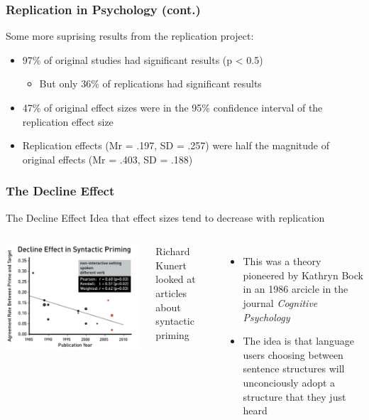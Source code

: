 \documentclass[10pt, block=fill]{beamer}
\begin{document}
\begin{frame}
  \frametitle{Replication in Psychology (cont.)}

  Some more suprising results from the replication project:
  \begin{itemize}
    \item 97\% of original studies had significant results (p < 0.5)
    \begin{itemize}
        \item But only 36\% of replications had significant results
    \end{itemize}
    \item 47\% of original effect sizes were in the 95\% confidence interval of the replication effect size
    \item Replication effects (Mr = .197, SD = .257) were half the magnitude of original effects (Mr = .403, SD = .188)
  \end{itemize}
\end{frame}


\begin{frame}
  \frametitle{The Decline Effect}
  
  \begin{block}{The Decline Effect}
      Idea that effect sizes tend to decrease with replication
  \end{block}
  
  \begin{columns}
    \includegraphics[width=0.95\linewidth]{figures/decline_effect.png}
   
    Richard Kunert looked at articles about syntactic priming
    \begin{itemize}
      \item This was a theory pioneered by Kathryn Bock in an 1986 arcicle in the journal \textit{Cognitive Psychology}
      \item The idea is that language users choosing between sentence structures will unconciously adopt a structure that they just heard
    \end{itemize}
  \end{columns}

\end{frame}
\end{document}
